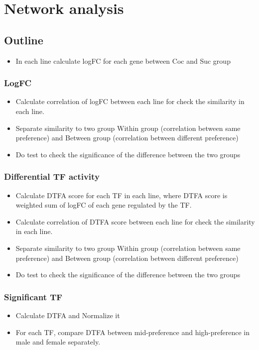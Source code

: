 \documentclass[11pt]{article}
\begin{document}
\section{Network analysis}
\label{sec:orga3221d6}
\subsection{Outline}
\label{sec:orgfa4473e}
\begin{itemize}
\item In each line calculate logFC for each gene between Coc and Suc group
\end{itemize}
\subsubsection{LogFC}
\label{sec:orgf1b6c2c}
\begin{itemize}
\item Calculate correlation of logFC between each line for check the similarity in each line.
\item Separate similarity to two group Within group (correlation between same preference) and 
Between group (correlation between different preference)
\item Do test to check the significance of the difference between the two groups
\end{itemize}
\subsubsection{Differential TF activity}
\label{sec:orgfb56e89}
\begin{itemize}
\item Calculate DTFA score for each TF in each line, where DTFA score is weighted sum of logFC of each gene regulated by the TF.
\item Calculate correlation of DTFA score between each line for check the similarity in each line.
\item Separate similarity to two group Within group (correlation between same preference) and 
Between group (correlation between different preference)
\item Do test to check the significance of the difference between the two groups
\end{itemize}
\subsubsection{Significant TF}
\label{sec:org5fcac7b}
\begin{itemize}
\item Calculate DTFA and Normalize it
\item For each TF, compare DTFA between mid-preference and high-preference in male and female separately.
\end{itemize}
\end{document}
